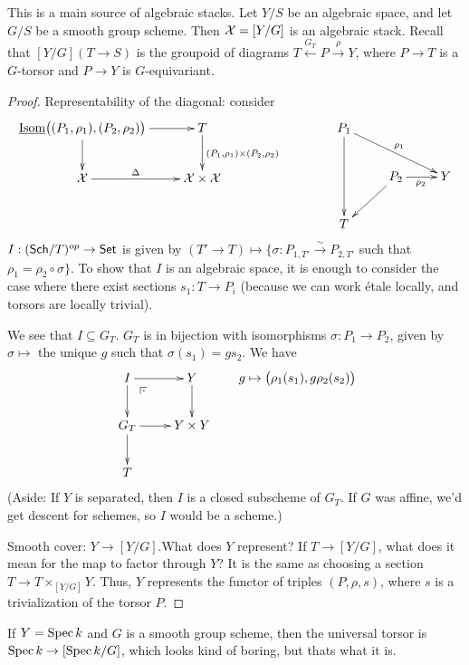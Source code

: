  \begin{example}
   This is a main source of algebraic stacks. Let $Y/S$ be an
algebraic space, and let
   $G/S$ be a smooth group scheme. Then $\mathcal{X}=[Y/G]$ is an algebraic
stack. Recall that
   $[Y/G](T\to S)$ is the groupoid of diagrams $T\xleftarrow{G_T}
P\xrightarrow\rho Y$, where $P\to T$ is a
   $G$-torsor and $P\to Y$ is $G$-equivariant.
   \begin{proof}
     Representability of the diagonal: consider
     \[\xymatrix{
      \isom\bigl((P_1,\rho_1),(P_2,\rho_2)\bigr) \ar[r]\ar[d]
        & T\ar[d]^{(P_1,\rho_1)\times(P_2,\rho_2)}\\
      \X \ar[r]^<>(.5)\Delta & \X\times \X
     }\qquad\qquad
     \xymatrix{
      P_1\ar[dd]\ar[drr]^{\rho_1}\\
      & P_2\ar[r]_{\rho_2}\ar[dl] & Y\\
      T
     }\]
      $I:(\text{\sf Sch}/T)^{op}\to \text{\sf Set}$ is given by $(T'\to T)\mapsto
     \{\sigma:P_{1,T'}\xrightarrow\sim P_{2,T'}$ such that
$\rho_1=\rho_2\circ \sigma\}$.
     To show that $I$ is an algebraic space, it is enough to consider
the case where
     there exist sections $s_1:T\to P_i$ (because we can work \'etale
locally, and
     torsors are locally trivial).

     We see that $I\subseteq G_T$. $G_T$ is in bijection with
isomorphisms $\sigma:P_1\to
     P_2$, given by $\sigma\mapsto$ the unique $g$ such that
$\sigma(s_1)=gs_2$. We have
     \[\xymatrix{
      I\ar[d]\ar[r]\ar@{}[dr]|(.25)\pb & Y\ar[d]\\
      G_T \ar[d]\ar[r] & Y\times Y\\
      T
     }\qquad
      g\mapsto \bigl(\rho_1(s_1),g\rho_2(s_2)\bigr)
     \]
      (Aside: If $Y$ is separated, then $I$ is a closed subscheme of
$G_T$. If $G$ was
      affine, we'd get descent for schemes, so $I$ would be a scheme.)

      Smooth cover: $Y\to [Y/G]$.What does $Y$ represent? If $T\to
[Y/G]$, what does it
      mean for the map to factor through $Y$? It is the same as
choosing a section $T\to
      T\times_{[Y/G]}Y$. Thus, $Y$ represents the functor of triples
$(P,\rho,s)$, where
      $s$ is a trivialization of the torsor $P$.
   \end{proof}
 \end{example}
 \begin{example}
   If $Y=\operatorname{Spec} k$ and $G$ is a smooth group scheme, then the
universal torsor is $\operatorname{Spec}
   k\to [\operatorname{Spec} k/G]$, which looks kind of boring, but thats what it
is.
 \end{example}
